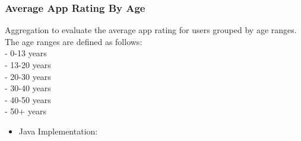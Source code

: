 \newpage

\subsubsection*{Average App Rating By Age}

Aggregation to evaluate the average app rating for users grouped by age ranges.
The age ranges are defined as follows:\\
- 0-13 years\\
- 13-20 years\\
- 20-30 years\\
- 30-40 years\\
- 40-50 years\\
- 50+ years
\begin{itemize}
    \item Java Implementation:
\end{itemize}

